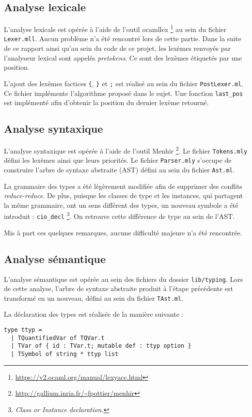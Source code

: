 \documentclass[french, 12pt]{article}
\begin{document}
\subsection*{Analyse lexicale}

L'analyse lexicale est opérée à l'aide de l'outil \textsf{ocamllex}%
\footnote{\url{https://v2.ocaml.org/manual/lexyacc.html}} au sein du fichier
\verb|Lexer.mll|. Aucun problème n'a été rencontré lors de cette partie.
Dans la suite de ce rapport ainsi qu'au sein du code de ce projet, les
lexèmes renvoyés par l'analyseur lexical sont appelés \emph{pretokens}. Ce
sont des lexèmes étiquetés par une position.

L'ajout des lexèmes factices \verb|{|, \verb|}| et \verb|;| est réalisé au sein
du fichier \verb|PostLexer.ml|. Ce fichier implémente l'algorithme proposé dans
le sujet. Une fonction \verb|last_pos| est implémenté afin d'obtenir la position
du dernier lexème retourné.

\subsection*{Analyse syntaxique}
L'analyse syntaxique est opérée à l'aide de l'outil \textsf{Menhir}%
\footnote{\url{http://gallium.inria.fr/~fpottier/menhir}}. Le fichier
\verb|Tokens.mly| défini les lexèmes ainsi que leurs priorités. Le fichier
\verb|Parser.mly| s'occupe de construire l'arbre de syntaxe abstraite (AST)
défini au sein du fichier \verb|Ast.ml|.

La grammaire des types a été légèrement modifiée afin de supprimer des conflits
\emph{reduce-reduce}. De plus, puisque les classes de type et les instances,
qui partagent la même grammaire, ont un sens différent des types, un nouveau
symbole a été introduit : \verb|cio_decl|%
\footnote{\it Class or Instance declaration.}. On retrouve cette différence de
type au sein de l'AST.

Mis à part ces quelques remarques, aucune difficulté majeure n'a été rencontrée.

\subsection*{Analyse sémantique}
L'analyse sémantique est opérée au sein des fichiers du dossier \verb|lib/typing|.
Lors de cette analyse, l'arbre de syntaxe abstraite produit à l'étape précédente
est transformé en un nouveau, défini au sein du fichier \verb|TAst.ml|.

La déclaration des types est réalisée de la manière suivante :
\begin{verbatim}
type ttyp =
  | TQuantifiedVar of TQVar.t
  | TVar of { id : TVar.t; mutable def : ttyp option }
  | TSymbol of string * ttyp list
\end{verbatim}
\end{document}
